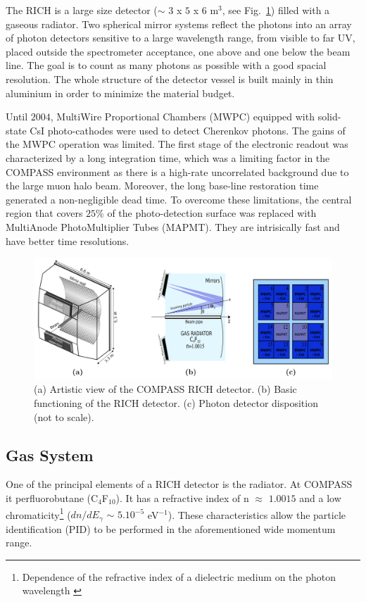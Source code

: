 The RICH is a large size detector ($\sim$ $3$ x $5$ x $6$ m$^3$, see Fig.~\ref{pic:RICHview}) filled with a gaseous radiator. Two spherical mirror systems reflect the photons into an array of photon detectors sensitive to a large wavelength range, from visible to far UV, placed outside the spectrometer acceptance, one above and one below the beam line. The goal is to count as many photons as possible with a good spacial resolution. The whole structure of the detector vessel is built mainly in thin aluminium in order to minimize the material budget.

Until $2004$, MultiWire Proportional Chambers (MWPC) equipped with solid-state CsI photo-cathodes were used to detect Cherenkov photons. The gains of the MWPC operation was limited. The first stage of the electronic readout was characterized by a long integration time, which was a limiting factor in the COMPASS environment as there is a high-rate uncorrelated background due to the large muon halo beam. Moreover, the long base-line restoration time generated a non-negligible dead time. To overcome these limitations, the central region that covers $25$\% of the photo-detection surface was replaced with MultiAnode PhotoMultiplier Tubes (MAPMT). They are intrisically fast and have better time resolutions.

\begin{figure}[!h]
  \centering
	\includegraphics[scale=0.4]{./gfx/RICHview.png}
	\caption{(a) Artistic view of the COMPASS RICH detector. (b) Basic functioning of the RICH detector. (c) Photon detector disposition (not to scale).}
	\label{pic:RICHview}
\end{figure}

\subsection{Gas System}

One of the principal elements of a RICH detector is the radiator. At COMPASS it perfluorobutane (C$_4$F$_{10}$). It has a refractive index of n $\approx$ $1.0015$ and a low chromaticity\footnote{Dependence of the refractive index of a dielectric medium on the photon wavelength \cite{Dispersion}} ($dn/dE_{\gamma}$ $\sim$ $5.10^{-5}$ eV$^{-1}$). These characteristics allow the particle identification (PID) to be performed in the aforementioned wide momentum range.

